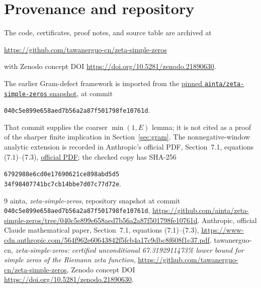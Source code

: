 \documentclass[11pt]{article}
\newcommand{\repo}{\url{https://github.com/tawanerguo-cn/zeta-simple-zeros}}
\begin{document}
\section{Provenance and repository}
\label{sec:provenance}
The code, certificates, proof notes, and source table are archived at
\begin{center}\repo\end{center}
with Zenodo concept DOI \url{https://doi.org/10.5281/zenodo.21890630}.

The earlier Gram-defect framework is imported from the
\href{https://github.com/ainta/zeta-simple-zeros/tree/040c5e899e658aed7b56a2a87f501798fe10761d}{pinned
\texttt{ainta/zeta-simple-zeros} snapshot}, at commit
\begin{center}
\small\texttt{040c5e899e658aed7b56a2a87f501798fe10761d}.
\end{center}
That commit supplies the coarser $\min(1,E)$ lemma; it is not cited as a proof
of the sharper finite implication in Section~\ref{sec:gram}.  The
nonnegative-window analytic extension is recorded in Anthropic's official
PDF, Section~7.1, equations (7.1)--(7.3),
\href{https://www-cdn.anthropic.com/564f962e60643842f5fcb4a17c9dbc8f608f1c37.pdf}{
official PDF}; the checked copy has SHA-256
\begin{center}
\small\texttt{6792988e6cd0e17690621ce898abd5d5}\\[-2pt]
\texttt{34f98407741bc7cb14bbe7d07c77d72e}.
\end{center}

{\small
\begin{thebibliography}{9}
ainta, \emph{zeta-simple-zeros}, repository snapshot at commit
\texttt{040c5e899e658aed7b56a2a87f501798fe10761d},
\url{https://github.com/ainta/zeta-simple-zeros/tree/040c5e899e658aed7b56a2a87f501798fe10761d}.
Anthropic, official Claude mathematical paper, Section~7.1, equations
(7.1)--(7.3),
\url{https://www-cdn.anthropic.com/564f962e60643842f5fcb4a17c9dbc8f608f1c37.pdf}.
tawanerguo-cn, \emph{zeta-simple-zeros: certified unconditional
67.3192911473\% lower bound for simple zeros of the Riemann zeta function},
\repo, Zenodo concept DOI \url{https://doi.org/10.5281/zenodo.21890630}.
\end{thebibliography}
}
\end{document}
